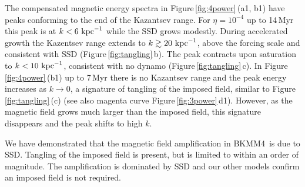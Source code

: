 \documentclass[preprint2]{aastex63}
\newcommand\kpc{~ {\rm kpc}}
\newcommand\pc{~ {\rm pc}}
\newcommand\dx{ {\delta x}}
\newcommand\BKM{{\sf BKMM4}}
\newcommand{\fg}[1]{\textcolor{midgreen}{#1}}
\begin{document}
 The compensated magnetic energy spectra in Figure\,\ref{fig:4power}\,(a1, b1)
 have \fg{peaks conforming to the end of the Kazantsev range.
 For $\eta=10^{-4}$ up to 14\,Myr this peak is at $k<6\kpc^{-1}$ while the
 SSD grows modestly.
 During accelerated growth the Kazentsev range extends to}
 $k\gtrsim 20\kpc^{-1}$, above the forcing scale and consistent with SSD
 (Figure\,\ref{fig:tangling}\,b).
 The peak contracts upon saturation to $k<10\kpc^{-1}$, consistent with no
 dynamo (Figure\,\ref{fig:tangling}\,c).
 In Figure\,\ref{fig:4power}\,(b1) \fg{up to 7\,Myr there is no Kazantsev range
 and the peak energy increases as $k\rightarrow0$, a signature of tangling of
 the imposed field, similar to Figure\,\ref{fig:tangling}\,(c) (see also
 magenta curve Figure\,\ref{fig:3power}\,d1).
 However, as the magnetic field grows much larger than the imposed field,
 this signature disappears and the peak shifts to high $k$.}
 
 \fg{We have demonstrated that the magnetic field amplification in \BKM\ is
 due to SSD. 
 Tangling of the imposed field is present, but is limited to within an
 order of magnitude.
 The amplification is dominated by SSD and our other models 
 confirm an imposed field is not required.
 }
 
\end{document}
